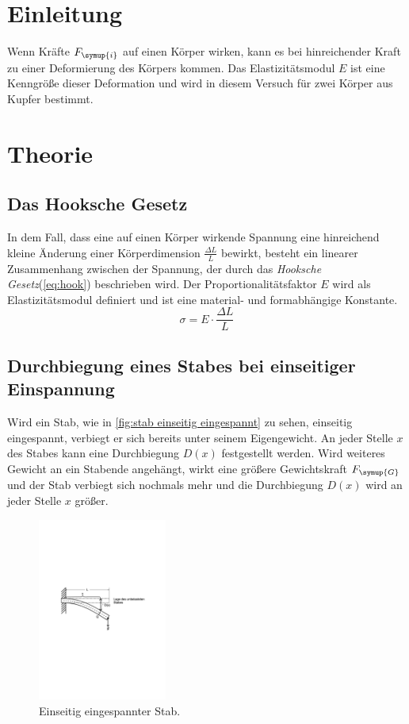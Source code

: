 \section{Einleitung}
Wenn Kräfte $F_{\symup{i}}$ auf einen Körper wirken, kann es bei hinreichender Kraft zu einer Deformierung des Körpers kommen.
Das Elastizitätsmodul $E$ ist eine Kenngröße dieser Deformation und wird in diesem Versuch für zwei Körper aus Kupfer bestimmt.

\section{Theorie}
\label{sec:Theorie}

\subsection{Das Hooksche Gesetz}
\label{sec:hook}
In dem Fall, dass eine auf einen Körper wirkende Spannung eine hinreichend kleine Änderung einer Körperdimension 
$\frac{\Delta L}{L}$ bewirkt, besteht ein linearer Zusammenhang zwischen der Spannung, der durch das 
\textit{Hooksche Gesetz}(\autoref{eq:hook}) beschrieben wird. Der Proportionalitätsfaktor $E$ wird als Elastizitätsmodul 
definiert und ist eine material- und formabhängige Konstante.
\begin{equation}
    \sigma = E \cdot \frac{\Delta L} {L}
    \label{eq:hook}
\end{equation}

\subsection{Durchbiegung eines Stabes bei einseitiger Einspannung}
\label{sec:einseitig}
Wird ein Stab, wie in \autoref{fig:stab einseitig eingespannt} zu sehen, einseitig eingespannt, verbiegt er sich bereits 
unter seinem Eigengewicht. An jeder Stelle $x$ des Stabes kann eine Durchbiegung $D(x)$ festgestellt werden.
Wird weiteres Gewicht an ein Stabende angehängt, wirkt eine größere Gewichtskraft $F_{\symup{G}}$ und der Stab 
verbiegt sich nochmals mehr und die Durchbiegung $D(x)$ wird an jeder Stelle $x$ größer.
\begin{figure}
    \centering
    \includegraphics[height=6cm]{content/Abbildungen/stab_einseitig_eingespannt.pdf}
    \caption{Einseitig eingespannter Stab. \cite{v103}}
    \label{fig:stab einseitig eingespannt}
\end{figure}

